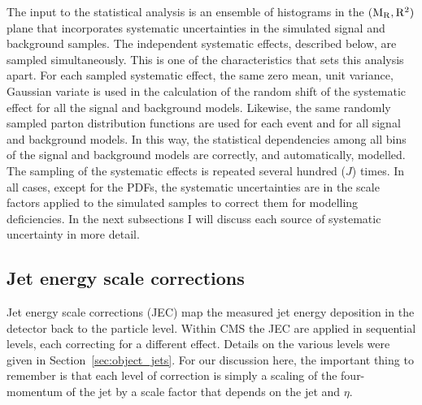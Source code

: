 
 
The input to the statistical analysis is an ensemble of histograms in the $(\mathrm{M_R},\mathrm{R^2})$ plane that 
incorporates systematic uncertainties in the simulated signal and background samples.  
The independent systematic effects, described below, are sampled simultaneously. 
This is one of the characteristics that sets this analysis apart. 
For each sampled systematic effect, the same zero mean, unit variance, Gaussian variate is used in
the calculation of the random shift of the systematic effect for all the signal and background
models. Likewise, the same randomly sampled parton distribution functions are used for each event
and for all signal and background models. 
In this way, the statistical dependencies among all bins of the signal and background models are
correctly, and automatically, modelled. The sampling of the systematic effects
is repeated several hundred ($J$) times.  
In all cases, except for the PDFs, the systematic uncertainties are in the scale factors 
applied to the simulated samples to correct them for modelling deficiencies. 
In the next subsections I will discuss each source of systematic uncertainty in more detail. 


\subsection{Jet energy scale corrections \label{sec:boost_JEC}}  

Jet energy scale corrections (JEC) map the measured jet energy deposition in the detector back to
the particle level. Within CMS the JEC are applied in sequential levels, each correcting for a
different effect. Details on the various levels were given in Section~\ref{sec:object_jets}.
For our discussion here, the important thing to remember is that each level of correction is simply
a scaling of the four-momentum of the jet by a scale factor that depends on the jet \pt and $\eta$.

